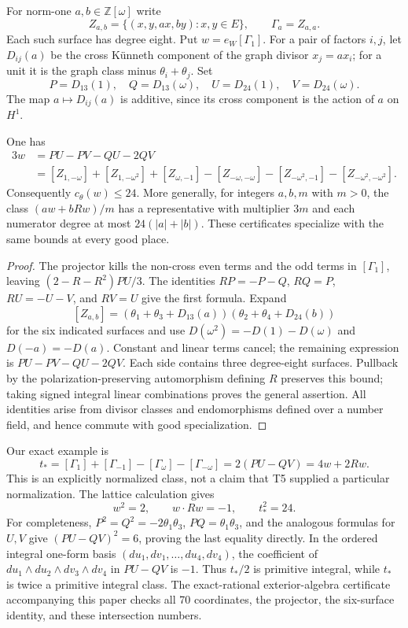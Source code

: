 For norm-one $a,b\in\mathbb Z[\omega]$ write
\[
 Z_{a,b}=\{(x,y,ax,by):x,y\in E\},\qquad \Gamma_a=Z_{a,a}.
\]
Each such surface has degree eight.  Put $w=e_W[\Gamma_1]$.  For a pair of factors $i,j$, let $D_{ij}(a)$ be the cross K\"unneth component of the graph divisor $x_j=ax_i$; for a unit it is the graph class minus $\theta_i+\theta_j$.  Set
\[
 P=D_{13}(1),\quad Q=D_{13}(\omega),\quad U=D_{24}(1),\quad V=D_{24}(\omega).
\]
The map $a\mapsto D_{ij}(a)$ is additive, since its cross component is the action of $a$ on $H^1$.

\begin{proposition}
\label{prop:P07}
One has
\begin{align*}
 3w&=PU-PV-QU-2QV\\
 &= [Z_{1,-\omega}]+[Z_{1,-\omega^2}]+[Z_{\omega,-1}]
 -[Z_{-\omega,-\omega}]-[Z_{-\omega^2,-1}]-[Z_{-\omega^2,-\omega^2}].
\end{align*}
Consequently $c_\theta(w)\leq24$.  More generally, for integers $a,b,m$ with $m>0$, the class $(aw+bRw)/m$ has a representative with multiplier $3m$ and each numerator degree at most $24(|a|+|b|)$.  These certificates specialize with the same bounds at every good place.
\end{proposition}
\begin{proof}
The projector kills the non-cross even terms and the odd terms in $[\Gamma_1]$, leaving $(2-R-R^2)PU/3$.  The identities
$RP=-P-Q$, $RQ=P$, $RU=-U-V$, and $RV=U$ give the first formula.  Expand
\[
 [Z_{a,b}]=(\theta_1+\theta_3+D_{13}(a))
            (\theta_2+\theta_4+D_{24}(b))
\]
for the six indicated surfaces and use $D(\omega^2)=-D(1)-D(\omega)$ and $D(-a)=-D(a)$.  Constant and linear terms cancel; the remaining expression is $PU-PV-QU-2QV$.  Each side contains three degree-eight surfaces.  Pullback by the polarization-preserving automorphism defining $R$ preserves this bound; taking signed integral linear combinations proves the general assertion.  All identities arise from divisor classes and endomorphisms defined over a number field, and hence commute with good specialization.
\end{proof}

Our exact example is
\begin{equation}
\label{eq:tstar}
 t_*=[\Gamma_1]+[\Gamma_{-1}]-[\Gamma_\omega]-[\Gamma_{-\omega}]
       =2(PU-QV)=4w+2Rw.
\end{equation}
This is an explicitly normalized class, not a claim that T5 supplied a particular normalization.  The lattice calculation gives
\[
 w^2=2,\qquad w\cdot Rw=-1,\qquad t_*^2=24.
\]
For completeness, $P^2=Q^2=-2\theta_1\theta_3$, $PQ=\theta_1\theta_3$, and the analogous formulas for $U,V$ give $(PU-QV)^2=6$, proving the last equality directly.  In the ordered integral one-form basis
$(du_1,dv_1,\ldots,du_4,dv_4)$, the coefficient of
$du_1\wedge du_2\wedge dv_3\wedge dv_4$ in $PU-QV$ is $-1$.
Thus $t_*/2$ is primitive integral, while $t_*$ is twice a primitive integral class.  The exact-rational exterior-algebra certificate accompanying this paper checks all 70 coordinates, the projector, the six-surface identity, and these intersection numbers.

